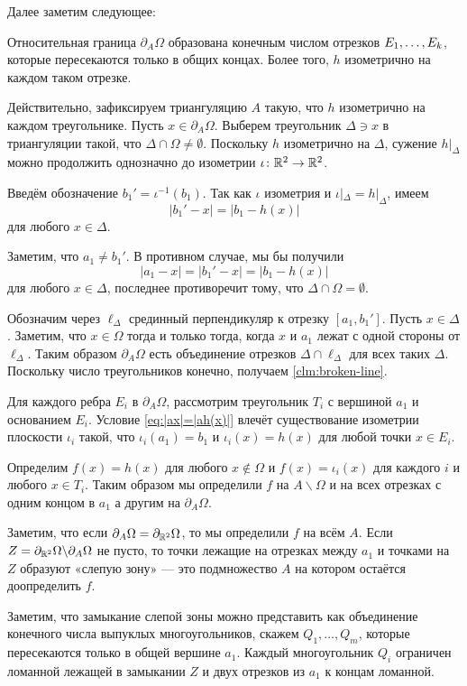 Далее заметим следующее:
\begin{clm}{}\label{clm:broken-line}
Относительная граница $\partial_A\Omega$ образована конечным числом отрезков
$E_1,\z\dots, E_k$, которые пересекаются только в общих концах. 
Более того, $h$ изометрично на каждом таком отрезке.
\end{clm}

Действительно, зафиксируем триангуляцию $A$ такую, что $h$ изометрично на каждом треугольнике.
Пусть $x\in \partial_A\Omega$.
Выберем треугольник $\Delta\ni x$ в триангуляции такой, что  $\Delta\cap\Omega\ne\emptyset$.
Поскольку $h$ изометрично на $\Delta$, 
сужение $h|_\Delta$ можно продолжить однозначно до изометрии 
$\iota\:\RR^2\z\to\RR^2$.

Введём обозначение $b_1'=\iota^{-1}(b_1)$.
Так как $\iota$ изометрия и $\iota|_\Delta = h|_\Delta$,
имеем
\[|b_1'-x|=|b_1-h(x)|\] 
для любого $x\in\Delta$.

Заметим, что $a_1\ne b_1'$.
В противном случае, 
мы бы получили 
$$|a_1-x|=|b_1'-x|=|b_1-h(x)|$$ для любого $x\in\Delta$, 
последнее противоречит тому, что $\Delta\cap\Omega=\emptyset$.

Обозначим через $\ell_\Delta$ срединный перпендикуляр к отрезку $[a_1, b_1']$.
Пусть  $x\in \Delta$.
Заметим, что 
$x\in\Omega$ тогда и только тогда, когда $x$ и $a_1$ лежат с одной стороны от $\ell_\Delta$.
Таким образом $\partial_A\Omega$ есть объединение отрезков $\Delta\cap\ell_\Delta$ для всех таких $\Delta$. 
Поскольку число треугольников конечно,
получаем \ref{clm:broken-line}.

Для каждого ребра $E_i$ в  $\partial_A\Omega$, 
рассмотрим треугольник $T_i$ с вершиной $a_1$ и основанием $E_i$.
Условие \ref{eq:|ax|=|ah(x)|} влечёт существование изометрии плоскости $\iota_i$ такой, что $\iota_i(a_1)= b_1$
и  $\iota_i(x)=h(x)$ для любой точки $x\in E_i$.

Определим
$f(x)=h(x)$ для любого $x\notin\Omega$
и $f(x)=\iota_i(x)$ для каждого $i$ и любого $x\in T_i$.
Таким образом мы определили $f$ на $A\backslash \Omega$ 
и на всех отрезках с одним концом в $a_1$ а другим на $\partial_A\Omega$.

Заметим, что если $\partial_{A}\Omega=\partial_{\mathbb{R}^2}\Omega$,
то мы определили $f$ на всём $A$.
Если $Z\z=\partial_{\RR^2}\Omega\backslash\partial_{A}\Omega$ не пусто, то точки лежащие на отрезках между $a_1$ и точками на $Z$ 
образуют «слепую зону» --- это подмножество $A$ на котором остаётся доопределить $f$.

Заметим, что замыкание слепой зоны можно представить как объединение конечного числа выпуклых многоугольников,
скажем $Q_1,\dots, Q_m$, 
которые пересекаются только в общей вершине $a_1$.
Каждый многоугольник $Q_i$ ограничен ломанной лежащей в замыкании $Z$ 
и двух отрезков из $a_1$ к концам ломанной. 

